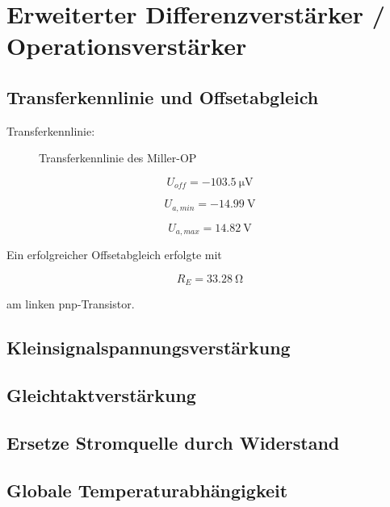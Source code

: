 \section{Erweiterter Differenzverstärker / Operationsverstärker}


\subsection{Transferkennlinie und Offsetabgleich}
Transferkennlinie:

\begin{figure}[H]
	\centering \small
	\scalebox{0.9}{}
	\caption{Transferkennlinie des Miller-OP}
	\label{fig_Kap5_13:transfer}
\end{figure}

\begin{equation}
    U_{off} = -\SI{103,5}{\micro\volt}
\end{equation}

\begin{equation}
    U_{a,min} = -\SI{14.99}{\volt}
\end{equation}

\begin{equation}
    U_{a,max} = \SI{14.82}{\volt}
\end{equation}

Ein erfolgreicher Offsetabgleich erfolgte mit 

\begin{equation}
    R_E = \SI{33,28}{\ohm}
\end{equation}

am linken pnp-Transistor.



\subsection{Kleinsignalspannungsverstärkung}


\subsection{Gleichtaktverstärkung}

\subsection{Ersetze Stromquelle durch Widerstand}

\subsection{Globale Temperaturabhängigkeit}


